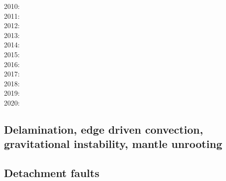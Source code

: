 {2010: \cite{hamo10}\cite{fasm10}\cite{grpy10}\cite{vago10}\cite{plmf10}\cite{spgs10a}\cite{pygp10}
      \cite{jabw10}\\
2011: \cite{rera11}\cite{chss11}\\
2012: \cite{wagw12}\cite{vacl12}\cite{buit12}\cite{kogp12}\cite{gohg12}\cite{trub12}\\
2013: \cite{wazh13}\cite{krcu13}\cite{frbm13}\cite{wagw13}\cite{duyp13}\cite{rugb13}
      \cite{scdg13}\\
2014: \cite{kava14}\cite{dusp14}\cite{wavp14}\cite{whbb14}\cite{scml14}
      \cite{mals14}\cite{gupm14}\cite{gahs14}\cite{mutg14}\\
2015: \cite{wavp15}\cite{thkp15}\cite{mags15}\cite{duys15}\cite{dusp15}\\
2016: \cite{wahz16}\\
2017: \cite{rugb17}\cite{ozgw17}\cite{vomc17}\cite{taac17}\cite{ithc17}\\
2018: \cite{wavp18}\cite{nigw18}\cite{bemc18}\cite{neew18}\\
2019: \cite{koen19}\cite{kipd19}\cite{crcm19}\cite{pedm19}\cite{mazz19}\cite{chch19}\\
2020: \cite{yamq20}
}

\subsection{Delamination, edge driven convection, gravitational instability, mantle unrooting} 

{\scriptsize
\noindent
\cite{kian95}
\cite{homo97}
\cite{kian98}\cite{scsc98}\cite{mafs98}
\cite{kiri00}\cite{scys00}
\cite{modo04}
\cite{elki07}
\cite{gopy08}\cite{vavg08}
\cite{vabv10}
\cite{lesm11}
\cite{krcu13}\cite{sths13}
\cite{baeg14}\cite{kava14}
\cite{wahz15}
\cite{bems17}
\cite{peka18}
}

\subsection{Detachment faults} 

